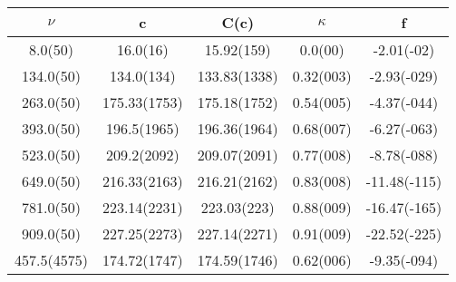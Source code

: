 \begin{table}[H]
	\centering
	\begin{tabular}{ccccc}
		$\nu$ & c & C(c) & $\kappa$ & f\\
		\hline
		8.0(50) & 16.0(16) & 15.92(159) & 0.0(00) & -2.01(-02)	\\
		134.0(50) & 134.0(134) & 133.83(1338) & 0.32(003) & -2.93(-029)	\\
		263.0(50) & 175.33(1753) & 175.18(1752) & 0.54(005) & -4.37(-044)	\\
		393.0(50) & 196.5(1965) & 196.36(1964) & 0.68(007) & -6.27(-063)	\\
		523.0(50) & 209.2(2092) & 209.07(2091) & 0.77(008) & -8.78(-088)	\\
		649.0(50) & 216.33(2163) & 216.21(2162) & 0.83(008) & -11.48(-115)	\\
		781.0(50) & 223.14(2231) & 223.03(223) & 0.88(009) & -16.47(-165)	\\
		909.0(50) & 227.25(2273) & 227.14(2271) & 0.91(009) & -22.52(-225)	\\
		457.5(4575) & 174.72(1747) & 174.59(1746) & 0.62(006) & -9.35(-094)	\\
	\end{tabular}
\end{table}
